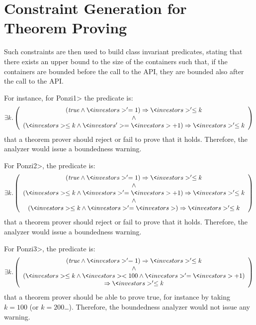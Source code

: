 \section{Constraint Generation for Theorem Proving}\label{sec:theorem_prover}

Such constraints are then used to build class invariant predicates,
stating that there exists an upper bound to the size of the containers
such that, if the containers are bounded before the call to the API,
they are bounded also after the call to the API.

For instance, for \<Ponzi1> the predicate is:
%
\[
  \exists k.\left(\begin{array}{c}
    (\mathit{true}\wedge\<investors>'=1)\Rightarrow\<investors>'\le k\\
    \wedge\\
    (\<investors>\le k\wedge\<investors'>=\<investors>+1)\Rightarrow\<investors>'\le k
  \end{array}\right)
\]
%
that a theorem prover should reject or fail to prove that it holds. Therefore,
the analyzer would issue a boundedness warning.

For \<Ponzi2>, the predicate is:
%
\[
  \exists k.\left(\begin{array}{c}
    (\mathit{true}\wedge\<investors>'=1)\Rightarrow\<investors>'\le k\\
    \wedge\\
    (\<investors>\le k\wedge\<investors>'=\<investors>+1)\Rightarrow\<investors>'\le k\\
    \wedge\\
    (\<investors>\le k\wedge\<investors>'=\<investors>)\Rightarrow\<investors>'\le k\\
  \end{array}\right)
\]
%
that a theorem prover should reject or fail to prove that it holds. Therefore,
the analyzer would issue a boundedness warning.

For \<Ponzi3>, the predicate is:
%
\[
  \exists k.\left(\begin{array}{c}
    (\mathit{true}\wedge\<investors>'=1)\Rightarrow\<investors>'\le k\\
    \wedge\\
    (\<investors>\le k\wedge\<investors><100\wedge\<investors>'=\<investors>+1)\\
    \Rightarrow\<investors>'\le k
  \end{array}\right)
\]
%
that a theorem prover should be able to prove true, for instance by taking
$k=100$ (or $k=200$\ldots). Therefore, the boundedness analyzer would not issue
any warning.

